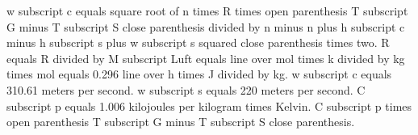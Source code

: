 w subscript c equals square root of n times R times open parenthesis T subscript G minus T subscript S close parenthesis divided by n minus n plus h subscript c minus h subscript s plus w subscript s squared close parenthesis times two.  
R equals R divided by M subscript Luft equals line over mol times k divided by kg times mol equals 0.296 line over h times J divided by kg.  
w subscript c equals 310.61 meters per second.  
w subscript s equals 220 meters per second.  
C subscript p equals 1.006 kilojoules per kilogram times Kelvin.  
C subscript p times open parenthesis T subscript G minus T subscript S close parenthesis.